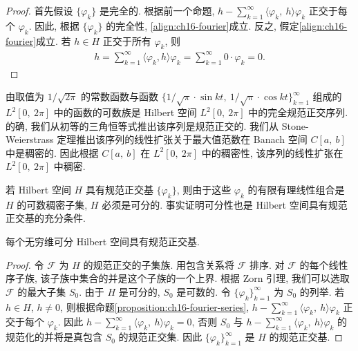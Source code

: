 \documentclass[../../main.tex]{subfiles}
\begin{document}
\begin{proof}
首先假设 $\{\varphi_{k}\}$ 是完全的. 根据前一个命题, $h-\sum_{k=1}^{\infty}\langle\varphi_{k},\ h\rangle\varphi_{k}$ 正交于每个 $\varphi_{k}$. 因此, 根据 $\{\varphi_{k}\}$ 的完全性, \eqref{align:ch16-fourier}成立. 反之, 假定\eqref{align:ch16-fourier}成立. 若 $h\in H$ 正交于所有 $\varphi_{k}$, 则
\begin{align*}
h=\sum_{k=1}^{\infty}\langle\varphi_{k},h\rangle\varphi_{k}=\sum_{k=1}^{\infty}0\cdot\varphi_{k}=0.
\end{align*}
\end{proof}

\begin{example}\label{example:ch16-trig-system}
由取值为 $1/\sqrt{2\pi}$ 的常数函数与函数 $\{1/\sqrt{\pi}\cdot\sin kt,\ 1/\sqrt{\pi}\cdot\cos kt\}_{k=1}^{\infty}$ 组成的 $L^{2}[0,\ 2\pi]$ 中的函数的可数族是 Hilbert 空间 $L^{2}[0,\ 2\pi]$ 中的完全规范正交序列. 的确, 我们从初等的三角恒等式推出该序列是规范正交的. 我们从 Stone-Weierstrass 定理推出该序列的线性扩张关于最大值范数在 Banach 空间 $C[a,\ b]$ 中是稠密的. 因此根据 $C[a,\ b]$ 在 $L^{2}[0,\ 2\pi]$ 中的稠密性, 该序列的线性扩张在 $L^{2}[0,\ 2\pi]$ 中稠密.
\end{example}

若 Hilbert 空间 $H$ 具有规范正交基 $\{\varphi_{k}\}$, 则由于这些 $\varphi_{k}$ 的有限有理线性组合是 $H$ 的可数稠密子集, $H$ 必须是可分的. 事实证明可分性也是 Hilbert 空间具有规范正交基的充分条件.

\begin{theorem}\label{theorem:ch16-separable-ono-basis}
每个无穷维可分 Hilbert 空间具有规范正交基.
\end{theorem}

\begin{proof}
令 $\mathcal{F}$ 为 $H$ 的规范正交的子集族. 用包含关系将 $\mathcal{F}$ 排序. 对 $\mathcal{F}$ 的每个线性序子族, 该子族中集合的并是这个子族的一个上界. 根据 Zorn 引理, 我们可以选取 $\mathcal{F}$ 的最大子集 $S_{0}$. 由于 $H$ 是可分的, $S_{0}$ 是可数的. 令 $\{\varphi_{k}\}_{k=1}^{\infty}$ 为 $S_{0}$ 的列举. 若 $h\in H$, $h\neq 0$, 则根据命题\cref{proposition:ch16-fourier-series}, $h-\sum_{k=1}^{\infty}\langle\varphi_{k},\ h\rangle\varphi_{k}$ 正交于每个 $\varphi_{k}$. 因此 $h-\sum_{k=1}^{\infty}\langle\varphi_{k},\ h\rangle\varphi_{k}=0$, 否则 $S_{0}$ 与 $h-\sum_{k=1}^{\infty}\langle\varphi_{k},\ h\rangle\varphi_{k}$ 的规范化的并将是真包含 $S_{0}$ 的规范正交集. 因此 $\{\varphi_{k}\}_{k=1}^{\infty}$ 是 $H$ 的规范正交基.
\end{proof}
\end{document}
